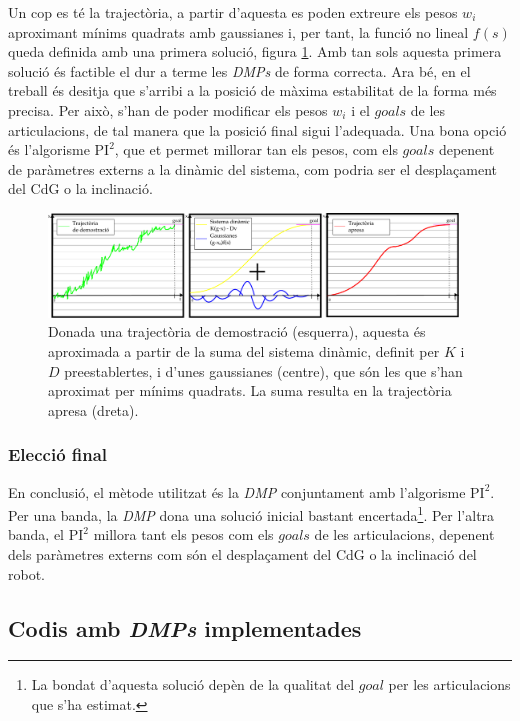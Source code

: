\documentclass[12pt,a4paper,final,twoside]{article}
\begin{document}
Un cop es té la trajectòria, a partir d'aquesta es poden extreure els pesos $w_i$ aproximant mínims quadrats amb gaussianes i, per tant, la funció no lineal $f(s)$ queda definida amb una primera solució, figura \ref{fig:LdF-trajectories}. Amb tan sols aquesta primera solució és factible el dur a terme les \textit{DMPs} de forma correcta. Ara bé, en el treball és desitja que s'arribi a la posició de màxima estabilitat de la forma més precisa. Per això, s'han de poder modificar els pesos $w_i$ i el $goals$ de les articulacions, de tal manera que la posició final sigui l'adequada. Una bona opció és l'algorisme $\mathrm{PI^2}$, que et permet millorar tan els pesos, com els $goals$ depenent de paràmetres externs a la dinàmic del sistema, com podria ser el desplaçament del CdG o la inclinació. 
\begin{figure}[tb]
\centering
\includegraphics[width=0.97\textwidth]{Imatges/Aprenentatge-per-demostracio.pdf}
\caption[\textit{DMP} a partir una trajectòria de demostració]{Donada una trajectòria de demostració (esquerra), aquesta és aproximada a partir de la suma del sistema dinàmic, definit per $K$ i $D$ preestablertes, i d'unes gaussianes (centre), que són les que s'han aproximat per mínims quadrats. La suma resulta en la trajectòria apresa (dreta).}
\label{fig:LdF-trajectories}
\end{figure}

\subsubsection{Elecció final}
En conclusió, el mètode utilitzat és la \textit{DMP} conjuntament amb l'algorisme $\mathrm{PI^2}$. Per una banda, la \textit{DMP} dona una solució inicial bastant encertada\footnote{La bondat d'aquesta solució depèn de la qualitat del $goal$ per les articulacions que s'ha estimat.}. Per l'altra banda, el $\mathrm{PI^2}$ millora tant els pesos com els $goals$ de les articulacions, depenent dels paràmetres externs com són el desplaçament del CdG o la inclinació del robot.


\subsection{Codis amb \textit{DMPs} implementades}
\label{codis-amb-DMPs-implementades}
\end{document}
